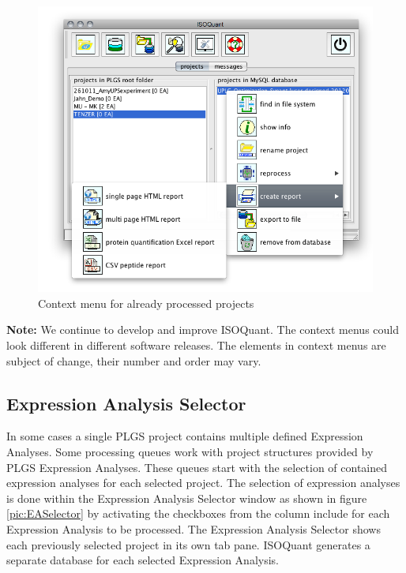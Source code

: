 \documentclass[]{article}
\begin{document}
\begin{figure}[htbp]
\centering
\includegraphics{pic/db_context.png}
\caption{Context menu for already processed projects
\label{pic:DBContextMenu}}
\end{figure}

\textbf{Note:} We continue to develop and improve ISOQuant. The context
menus could look different in different software releases. The elements
in context menus are subject of change, their number and order may vary.

\clearpage

\subsection{Expression Analysis
Selector}\label{expression-analysis-selector}

In some cases a single PLGS project contains multiple defined Expression
Analyses. Some processing queues work with project structures provided
by PLGS Expression Analyses. These queues start with the selection of
contained expression analyses for each selected project. The selection
of expression analyses is done within the Expression Analysis Selector
window as shown in figure \ref{pic:EASelector} by activating the
checkboxes from the column include for each Expression Analysis to be
processed. The Expression Analysis Selector shows each previously
selected project in its own tab pane. ISOQuant generates a separate
database for each selected Expression Analysis.
\end{document}

